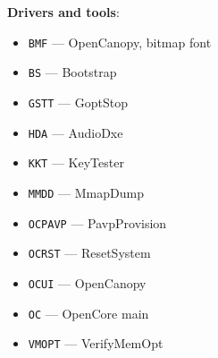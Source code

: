\documentclass[]{article}
\providecommand{\tightlist}{%
  \setlength{\itemsep}{0pt}\setlength{\parskip}{0pt}}
\begin{document}
\begin{enumerate}
  \textbf{Drivers and tools}:
  \begin{itemize}
  \tightlist
  \item \texttt{BMF} --- OpenCanopy, bitmap font
  \item \texttt{BS} --- Bootstrap
  \item \texttt{GSTT} --- GoptStop
  \item \texttt{HDA} --- AudioDxe
  \item \texttt{KKT} --- KeyTester
  \item \texttt{MMDD} --- MmapDump
  \item \texttt{OCPAVP} --- PavpProvision
  \item \texttt{OCRST} --- ResetSystem
  \item \texttt{OCUI} --- OpenCanopy
  \item \texttt{OC} --- OpenCore main
  \item \texttt{VMOPT} --- VerifyMemOpt
  \end{itemize}


\end{enumerate}
\end{document}
